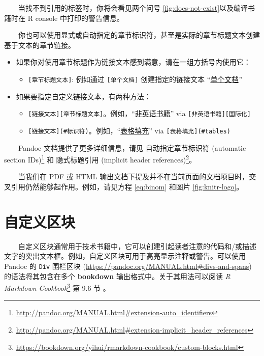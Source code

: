 \documentclass[
  12pt,
]{krantz}
\providecommand{\tightlist}{%
  \setlength{\itemsep}{0pt}\setlength{\parskip}{0pt}}
\renewcommand{\href}[2]{#2\footnote{\url{#1}}}
\theoremstyle{definition}
\theoremstyle{definition}
\theoremstyle{definition}
\theoremstyle{definition}
\theoremstyle{remark}
\begin{document}
  当找不到引用的标签时，你将会看见两个问号 \ref{fig:does-not-exist}以及编译书籍时在 R console 中打印的警告信息。

  你也可以使用显式或自动指定的章节标识符，甚至是实际的章节标题文本创建基于文本的章节链接。

\begin{itemize}
\tightlist
\item
  如果你对使用章节标题作为链接文本感到满意，请在一组方括号内使用它：

  \begin{itemize}
  \tightlist
  \item
    \texttt{{[}章节标题文本{]}}: 例如通过 \texttt{{[}单个文档{]}} 创建指定的链接文本 ``\protect\hyperlink{a-single-document}{单个文档}''
  \end{itemize}
\item
  如果要指定自定义链接文本，有两种方法：

  \begin{itemize}
  \tightlist
  \item
    \texttt{{[}链接文本{]}{[}章节标题文本{]}}。例如，``\protect\hyperlink{internationalization}{非英语书籍}'' via \texttt{{[}非英语书籍{]}{[}国际化{]}}
  \item
    \texttt{{[}链接文本{]}(\#标识符)}。例如，``\protect\hyperlink{tables}{表格填充}'' via \texttt{{[}表格填充{]}(\#tables)}
  \end{itemize}
\end{itemize}

  Pandoc 文档提供了更多详细信息，请见 \href{http://pandoc.org/MANUAL.html\#extension-auto_identifiers}{自动指定章节标识符 (automatic section IDs)} 和 \href{http://pandoc.org/MANUAL.html\#extension-implicit_header_references}{隐式标题引用 (implicit header references)}。

  当我们在 PDF 或 HTML 输出文档下提及并不在当前页面的文档项目时，交叉引用仍然能够起作用。例如，请见方程 \eqref{eq:binom} 和图片 \ref{fig:knitr-logo}。

\hypertarget{ux81eaux5b9aux4e49ux533aux5757}{%
\section{自定义区块}\label{ux81eaux5b9aux4e49ux533aux5757}}

  自定义区块通常用于技术书籍中，它可以创建引起读者注意的代码和/或描述文字的突出文本框。例如，自定义区块可用于高亮显示注释或警告。可以使用 Pandoc 的 \texttt{Div} 围栏区块 (\url{https://pandoc.org/MANUAL.html\#divs-and-spans}) 的语法将其包含在多个 \textbf{bookdown} 输出格式中。关于其用法可以阅读 \href{https://bookdown.org/yihui/rmarkdown-cookbook/custom-blocks.html}{\emph{R Markdown Cookbook}} 第 9.6 节 \citep{rmarkdown2020}。
\end{document}
